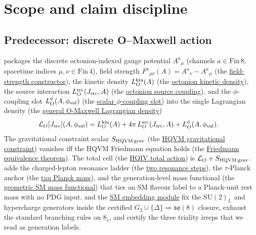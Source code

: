\documentclass[11pt]{amsart}
\begin{document}
\begin{abstract}
\noindent\textbf{Status.}
What is proved: the five sector equalities, the total-action
split, the parameter witness, and Yukawa linearity over flavours.
What is named explicitly and \emph{not} claimed: anomaly
cancellation, measure choice, and the full non-abelian holonomy
upgrade (scaffolded upstream but not closed here).
\end{abstract}
\maketitle



\section{Scope and claim discipline}
\label{sec:scope}

\subsection{Predecessor: discrete O--Maxwell action}

\cite{hqiv-oct-action-paper} packages the discrete octonion-indexed gauge
potential $A^a{}_\mu$ (channels $a\in\mathrm{Fin}\,8$, spacetime indices
$\mu,\nu\in\mathrm{Fin}\,4$), field strength
$F^a{}_{\mu\nu}(A)=A^a{}_\nu - A^a{}_\mu$ (the
\hyperref[lean:F-from-A]{field-strength constructor}), the kinetic density
$L_O^{\rm kin}(A)$ (the
\hyperref[lean:LO-kin]{octonion kinetic density}), the source interaction
$L_O^{\rm src}(J_{\rm src},A)$ (the
\hyperref[lean:LO-src]{octonion source coupling}), and the $\phi$-coupling
slot $L_O^\phi(A,\phi_{\rm val})$ (the
\hyperref[lean:LO-phi]{scalar $\phi$-coupling slot}) into the single
Lagrangian density (the
\hyperref[lean:LO-maxwell]{general O-Maxwell Lagrangian density})
\[
\mathcal{L}_O[J_{\rm src}](A,\phi_{\rm val})
= L_O^{\rm kin}(A) + 4\pi\,L_O^{\rm src}(J_{\rm src},A)
+ L_O^\phi(A,\phi_{\rm val}).
\]
The gravitational constraint scalar $S_{\rm HQVM\,grav}$ (the
\hyperref[lean:SHQVM-grav]{HQVM gravitational constraint}) vanishes iff the
HQVM Friedmann equation holds (the
\hyperref[lean:friedmann-iff]{Friedmann equivalence theorem}). The total cell
(the \hyperref[lean:action-total]{HQIV total action}) is
$\mathcal{L}_O+S_{\rm HQVM\,grav}$. \cite{hqiv-mass-spectrum-paper} adds the
charged-lepton resonance ladder (the
\hyperref[lean:resonance-steps]{two resonance steps}), the $\tau$-Planck
anchor (the \hyperref[lean:m-tau-pl]{tau Planck mass}), and the
generation-level mass functional (the
\hyperref[lean:sm-mass-label]{geometric SM mass functional}) that ties an SM
flavour label to a Planck-unit rest mass with no PDG input.
\cite{hqiv-so8-paper} and the
\hyperref[lean:sm-embedding]{SM embedding module} fix the
$\mathrm{SU}(2)_L$ and hypercharge generators inside the certified
$G_2\cup\{\Delta\}\Rightarrow\mathfrak{so}(8)$ closure, exhaust the
standard branching rules on $8_s$, and certify the three triality irreps
that we read as generation labels.
\end{document}
